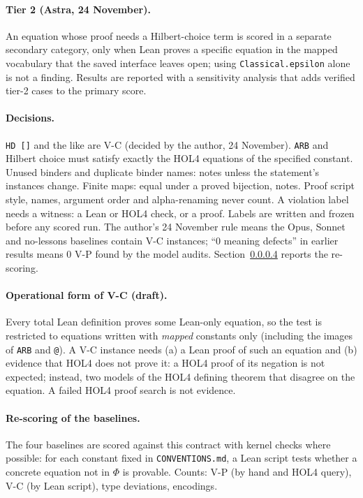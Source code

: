 \documentclass[11pt,a4paper]{article}
\newcommand{\code}[1]{\texttt{#1}}
\begin{document}
\paragraph{Tier 2 (Astra, 24 November).} An equation whose proof needs a Hilbert-choice term is scored in a separate secondary category, only when Lean proves a specific equation in the mapped vocabulary that the saved interface leaves open; using \code{Classical.epsilon} alone is not a finding. Results are reported with a sensitivity analysis that adds verified tier-2 cases to the primary score. \paragraph{Decisions.} \code{HD []} and the like are V-C (decided by the author, 24 November). \code{ARB} and Hilbert choice must satisfy exactly the HOL4 equations of the specified constant. Unused binders and duplicate binder names: notes unless the statement's instances change. Finite maps: equal under a proved bijection, notes. Proof script style, names, argument order and alpha-renaming never count. A violation label needs a witness: a Lean or HOL4 check, or a proof. Labels are written and frozen before any scored run. The author's 24 November rule means the Opus, Sonnet and no-lessons baselines contain V-C instances; ``0 meaning defects'' in earlier results means 0 V-P found by the model audits. Section~\ref{sec:rescore} reports the re-scoring.
\paragraph{Operational form of V-C (draft).} Every total Lean definition proves some Lean-only equation, so the test is restricted to equations written with \emph{mapped} constants only (including the images of \code{ARB} and \code{@}). A V-C instance needs (a) a Lean proof of such an equation and (b) evidence that HOL4 does not prove it: a HOL4 proof of its negation is not expected; instead, two models of the HOL4 defining theorem that disagree on the equation. A failed HOL4 proof search is not evidence.
\paragraph{Re-scoring of the baselines.}\label{sec:rescore} The four baselines are scored against this contract with kernel checks where possible: for each constant fixed in \code{CONVENTIONS.md}, a Lean script tests whether a concrete equation not in $\Phi$ is provable. Counts: V-P (by hand and HOL4 query), V-C (by Lean script), type deviations, encodings.
\end{document}
